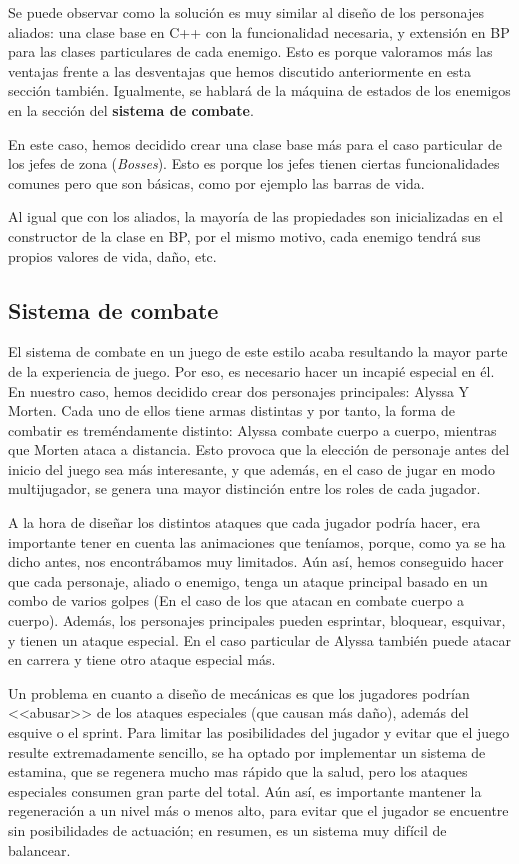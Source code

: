 Se puede observar como la solución es muy similar al diseño de los personajes aliados: una clase base en C++ con la funcionalidad necesaria, y extensión en \ac{BP} para las clases particulares de cada enemigo. Esto es porque valoramos más las ventajas frente a las desventajas que hemos discutido anteriormente en esta sección también. Igualmente, se hablará de la máquina de estados de los enemigos en la sección del \textbf{sistema de combate}.


En este caso, hemos decidido crear una clase base más para el caso particular de los jefes de zona (\textit{Bosses}). Esto es porque los jefes tienen ciertas funcionalidades comunes pero que son básicas, como por ejemplo las barras de vida.


Al igual que con los aliados, la mayoría de las propiedades son inicializadas en el constructor de la clase en \ac{BP}, por el mismo motivo, cada enemigo tendrá sus propios valores de vida, daño, etc.

\subsection{Sistema de combate}
El sistema de combate en un juego de este estilo acaba resultando la mayor parte de la experiencia de juego. Por eso, es necesario hacer un incapié especial en él.
En nuestro caso, hemos decidido crear dos personajes principales: Alyssa Y Morten. Cada uno de ellos tiene armas distintas y por tanto, la forma de combatir es treméndamente distinto: Alyssa combate cuerpo a cuerpo, mientras que Morten ataca a distancia. Esto provoca que la elección de personaje antes del inicio del juego sea más interesante, y que además, en el caso de jugar en modo multijugador, se genera una mayor distinción entre los roles de cada jugador. 


A la hora de diseñar los distintos ataques que cada jugador podría hacer, era importante tener en cuenta las animaciones que teníamos, porque, como ya se ha dicho antes, nos encontrábamos muy limitados. Aún así, hemos conseguido hacer que cada personaje, aliado o enemigo, tenga un ataque principal basado en un combo de varios golpes (En el caso de los que atacan en combate cuerpo a cuerpo). Además, los personajes principales pueden esprintar, bloquear, esquivar, y tienen un ataque especial.
En el caso particular de Alyssa también puede atacar en carrera y tiene otro ataque especial más. 


Un problema en cuanto a diseño de mecánicas es que los jugadores podrían <<abusar>> de los ataques especiales (que causan más daño), además del esquive o el sprint. Para limitar las posibilidades del jugador y evitar que el juego resulte extremadamente sencillo, se ha optado por implementar un sistema de estamina, que se regenera mucho mas rápido que la salud, pero los ataques especiales consumen gran parte del total. Aún así, es importante mantener la regeneración a un nivel más o menos alto, para evitar que el jugador se encuentre sin posibilidades de actuación; en resumen, es un sistema muy difícil de balancear. 


